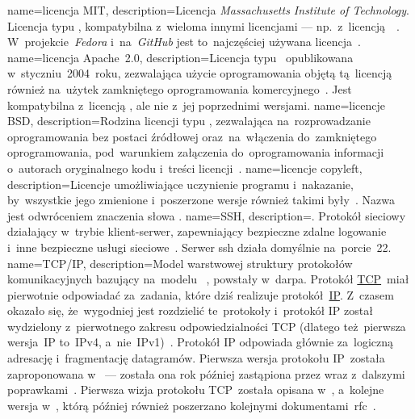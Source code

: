 {
	name={licencja MIT},
	description={Licencja \emph{Massachusetts Institute of Technology}. Licencja typu , kompatybilna z~wieloma innymi  licencjami --- np.~z~licencją~~\cite{mit}. W~projekcie~\emph{Fedora} i~na~\emph{GitHub} jest to~najczęściej używana licencja~\cite{mit-popularity-fedora,mit-popularity-github,wiki:licenses-comparison}.}
}
{
	name={licencja Apache~2.0},
	description={Licencja typu ~opublikowana w~styczniu~2004~roku, zezwalająca użycie oprogramowania objętą tą~licencją również na~użytek zamkniętego oprogramowania komercyjnego~\cite{apache2.0,wiki:licenses-comparison}. Jest kompatybilna z~licencją , ale nie z~jej poprzednimi wersjami.}
}
{
	name={licencje BSD},
	description={Rodzina licencji typu , zezwalająca na~rozprowadzanie oprogramowania bez postaci źródłowej oraz~na~włączenia do~zamkniętego oprogramowania, pod~warunkiem załączenia do~oprogramowania informacji o~autorach oryginalnego kodu i~treści licencji~\cite{bsd,wiki:licenses-comparison}.}
}
{
	name={licencje copyleft},
	description={Licencje umożliwiające uczynienie programu  i~nakazanie, by~wszystkie jego zmienione i~poszerzone wersje również takimi były~\cite{copyleft,wiki:licenses-comparison}. Nazwa  jest odwróceniem znaczenia słowa .}
}
{
	name={SSH},
	description={. Protokół sieciowy działający w~trybie klient-serwer, zapewniający bezpieczne zdalne logowanie i~inne bezpieczne usługi sieciowe~\cite{rfc:ssh}. Serwer \gls{ssh} działa domyślnie na~porcie~22.}
}
{
	name={TCP/IP},
	description={Model warstwowej struktury protokołów komunikacyjnych bazujący na~modelu ~\cite{rfc:tcpip-dod}, powstały w~\gls{darpa}. Protokół \href{https://en.wikipedia.org/wiki/Transmission_Control_Protocol}{TCP}~miał pierwotnie odpowiadać za~zadania, które dziś realizuje protokół~\href{https://en.wikipedia.org/wiki/Internet_Protocol}{IP}. Z~czasem okazało się, że~wygodniej jest rozdzielić te~protokoły i~protokół IP został wydzielony z~pierwotnego zakresu odpowiedzialności TCP (dlatego też~pierwsza wersja~IP to~IPv4, a~nie~IPv1)~\cite{tcpguide-tcpip-history}. Protokół IP odpowiada głównie za~logiczną adresację i~fragmentację datagramów. Pierwsza wersja protokołu IP~została zaproponowana w~ --- została ona rok później zastąpiona przez  wraz z~dalszymi poprawkami~\cite{rfc:ip-rfc760,rfc:ip-rfc791}. Pierwsza wizja protokołu TCP~została opisana w~, a~kolejne wersja w~, którą później również poszerzano kolejnymi dokumentami~\gls{rfc}~\cite{rfc:tcp-rfc675,rfc:ip-rfc793}.}
}
